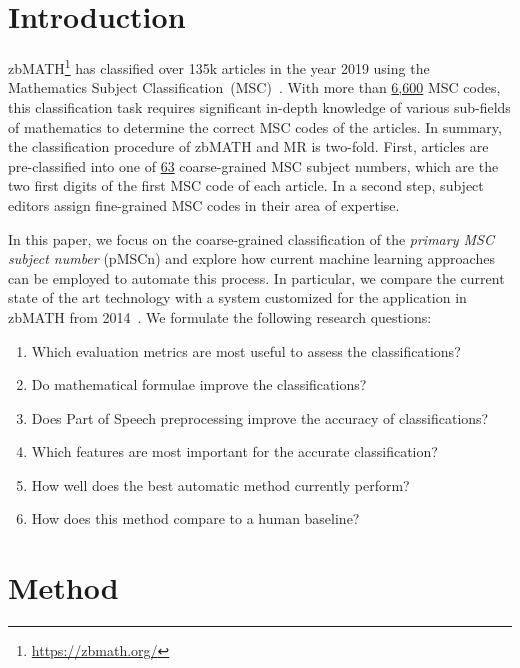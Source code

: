 \section{Introduction}\label{sec:intro}
zbMATH\footnote{\href{https://zbmath.org/}{{https://zbmath.org/}}} has classified over 135k articles in the year 2019 using the Mathematics Subject Classification~(MSC)~\cite{Khnemund2016}.
With more than \href{https://zbmath.org/classification/}{{6,600}} MSC codes, this classification task requires significant in-depth knowledge of various sub-fields of mathematics to determine the correct MSC codes of the articles.
In summary, the classification procedure of zbMATH and MR is two-fold.
First, articles are pre-classified into one of \href{https://msc2020.org}{{63}} coarse-grained MSC subject numbers, which are the two first digits of the first MSC code of each article.
In a second step, subject editors assign fine-grained MSC codes in their area of expertise.

In this paper, we focus on the coarse-grained classification of the \emph{primary MSC subject number} (pMSCn) and explore how current machine learning approaches can be employed to automate this process.
In particular, we compare the current state of the art technology with a system customized for the application in zbMATH from 2014~\cite{SchonebergS14}.
We formulate the following research questions:

\begin{enumerate}
  \def\labelenumi{\arabic{enumi}.}
  \item
  Which evaluation metrics are most useful to assess the classifications?
  \item
  Do mathematical formulae improve the classifications?
  \item
  Does Part of Speech preprocessing improve the accuracy of classifications?
  \item
  Which features are most important for the accurate classification?
  \item
  How well does the best automatic method currently perform?
  \item
  How does this method compare to a human baseline?
\end{enumerate}

\section{Method}\label{sec:method}


